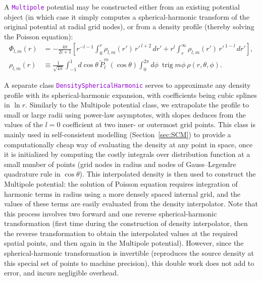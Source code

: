 \documentclass[12pt]{article}
\newcommand{\ttt}[1]{\textcolor{darkviolet}{\texttt{#1}}}
\DeclareMathOperator{\trig}{trig}
\begin{document}
A \ttt{Multipole} potential may be constructed either from an existing potential object (in which case it simply computes a spherical-harmonic transform of the original potential at radial grid nodes), or from a density profile (thereby solving the Poisson equation):
\begin{align}
\Phi_{l,m}(r) &= -\frac{4\pi}{2l+1} \left[ r^{-l-1} \int_0^r \rho_{l,m}(r')\,{r'}^{\,l+2}\,dr' + r^l\int_r^\infty \rho_{l,m}(r')\,{r'}^{\,1-l}\,dr' \right],  \label{eq:SphHarmPoisson} \\
\rho_{l,m}(r) &\equiv \frac{1}{\sqrt{4\pi}} \int_{-1}^1 d\cos\theta\, \tilde P_l^m(\cos\theta) \int_0^{2\pi}d\phi\:\trig m\phi\:\rho(r,\theta,\phi) .  \label{eq:SphHarmDensity}
\end{align}

A separate class \ttt{DensitySphericalHarmonic} serves to approximate any density profile with its spherical-harmonic expansion, with coefficients being cubic splines in $\ln r$. 
Similarly to the Multipole potential class, we extrapolate the profile to small or large radii using power-law asymptotes, with slopes deduces from the values of the $l=0$ coefficient at two inner- or outermost grid points. This class is mainly used in self-consistent modelling (Section~\ref{sec:SCM}) to provide a computationally cheap way of evaluating the density at any point in space, once it is initialized by computing the costly integrals over distribution function at a small number of points (grid nodes in radius and nodes of Gauss--Legendre quadrature rule in $\cos\theta$). This interpolated density is then used to construct the Multipole potential: the solution of Poisson equation requires integration of harmonic terms in radius using a more densely spaced internal grid, and the values of these terms are easily evaluated from the density interpolator. Note that this process involves two forward and one reverse spherical-harmonic transformation (first time during the construction of density interpolator, then the reverse transformation to obtain the interpolated values at the required spatial points, and then again in the Multipole potential). However, since the spherical-harmonic transformation is invertible (reproduces the source density at this special set of points to machine precision), this double work does not add to error, and incurs negligible overhead.
\end{document}
